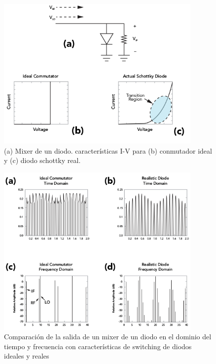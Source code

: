 \documentclass[a4paper,10pt]{article}
\begin{document}
	\begin{figure}[!htb]
		\centering
		\includegraphics[width=10cm]
		{Images/OneDiodeMixer.png}
		\caption{(a) Mixer de un diodo. características I-V para (b)
		conmutador ideal y (c) diodo schottky real.}
		\label{img:002} 
	\end{figure}

	\begin{figure}[!htb]
		\centering
		\includegraphics[width=10cm]
		{Images/OneDiodeMixerFunction.png}
		\caption{Comparaci\'on de la salida de un mixer de un diodo en el 
		dominio del tiempo y frecuencia con características de switching 
		de diodos ideales y reales} 
		\label{img:003} 
	\end{figure}
\end{document}
